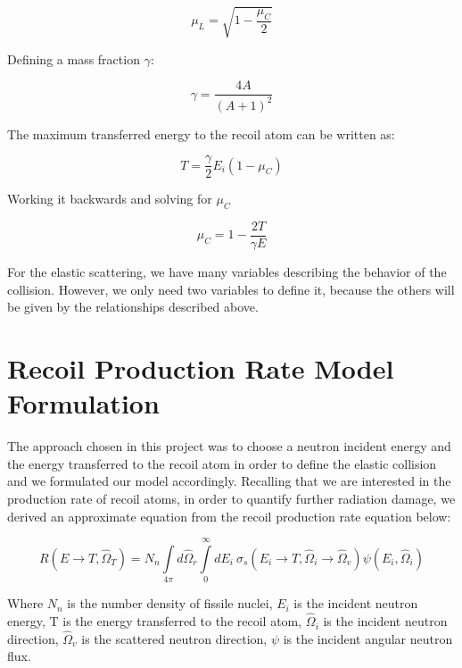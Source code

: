 \documentclass[review]{elsarticle}
\begin{document}
\begin{equation}
	\mu_L = \sqrt{1 - \frac{\mu_C}{2}}
\end{equation}

Defining a mass fraction $\gamma$:

\begin{equation}
	\gamma = \frac{4 A}{(A+1)^2}
\end{equation}

The maximum transferred energy to the recoil atom can be written as:

\begin{equation}
	T = \frac{\gamma}{2} E_i (1-\mu_C)
\end{equation}

Working it backwards and solving for $\mu_C$

\begin{equation}
	\mu_C = 1 - \frac{2 T}{\gamma E}
	\label{eq:muc}
\end{equation}

For the elastic scattering, we have many variables describing the behavior of the collision. However, we only need two variables to define it, because the others will be given by the relationships described above.

\section{Recoil Production Rate Model Formulation}

The approach chosen in this project was to choose a neutron incident energy and the energy transferred to the recoil atom in order to define the elastic collision and we formulated our model accordingly. Recalling that we are interested in the production rate of recoil atoms, in order to quantify further radiation damage, we derived an approximate equation from the recoil production rate equation below:

\begin{equation}
	R(E \rightarrow T,\hat{\Omega}_T) = N_n  \int\limits_{4\pi} d \hat{\Omega}_r \int\limits_0^\infty dE_i \ \sigma_{s}(E_i \rightarrow T, \hat{\Omega}_i \rightarrow \hat{\Omega}_v) \psi(E_i, \hat{\Omega}_i)
\label{eq:rate}
\end{equation}

Where $N_n$ is the number density of fissile nuclei, $E_i$ is the incident neutron energy, T is the energy transferred to the recoil atom, $\hat{\Omega}_i$ is the incident neutron direction, $\hat{\Omega}_v$ is the scattered neutron direction, $\psi$ is the incident angular neutron flux. 
\end{document}
